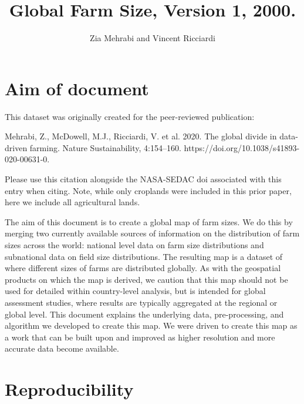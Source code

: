 \documentclass{article}\usepackage[]{graphicx}\usepackage[]{xcolor}
\title{Global Farm Size, Version 1, 2000.}
\author{Zia Mehrabi and Vincent Ricciardi}
\begin{document}






\maketitle

\tableofcontents

\newpage
\section{Aim of document}

This dataset was originally created for the peer-reviewed publication: 

Mehrabi, Z., McDowell, M.J., Ricciardi, V. et al. 2020. The global divide in data-driven farming. Nature Sustainability, 4:154–160. https://doi.org/10.1038/s41893-020-00631-0. 

Please use this citation alongside the NASA-SEDAC doi associated with this entry when citing. Note, while only croplands were included in this prior paper, here we include all agricultural lands. 

The aim of this document is to create a global map of farm sizes. We do this by merging two currently available sources of information on the distribution of farm sizes across the world: national level data on farm size distributions and subnational data on field size distributions. The resulting map is a dataset of where different sizes of farms are distributed globally. As with the geospatial products on which the map is derived, we caution that this map should not be used for detailed within country-level analysis, but is intended for global assessment studies, where results are typically aggregated at the regional or global level. This document explains the underlying data, pre-processing, and algorithm we developed to create this map. We were driven to create this map as a work that can be built upon and improved as higher resolution and more accurate data become available.


\section{Reproducibility}
\label{reproducibility}
\end{document}
